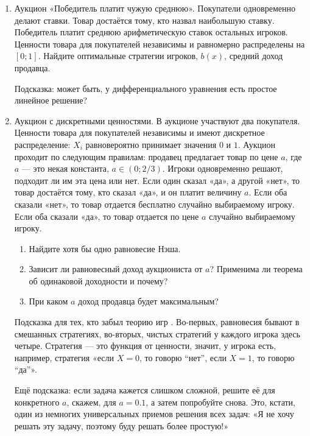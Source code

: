 \begin{enumerate}
\item Аукцион «Победитель платит чужую среднюю». Покупатели одновременно делают ставки. Товар достаётся тому, кто назвал наибольшую ставку. Победитель платит среднюю арифметическую ставок остальных игроков. Ценности товара для покупателей независимы и равномерно распределены на $ [0;1] $. Найдите оптимальные стратегии игроков, $ b(x) $, средний доход продавца.

Подсказка: может быть, у дифференциального уравнения есть простое линейное решение?


\item Аукцион с дискретными ценностями. В аукционе участвуют два покупателя. Ценности товара для покупателей независимы и имеют дискретное распределение: $ X_{i} $ равновероятно принимает значения $ 0 $ и $ 1 $. Аукцион проходит по следующим правилам: продавец предлагает товар по цене $ a $, где $ a $ — это некая константа, $ a\in (0;2/3) $. Игроки одновременно решают, подходит ли им эта цена или нет. Если один сказал «да», а другой «нет», то товар достаётся тому, кто сказал «да», и он платит величину $a$. Если оба сказали «нет», то товар отдается бесплатно случайно выбираемому игроку. Если оба сказали «да», то товар отдается по цене $ a $ случайно выбираемому игроку.

\begin{enumerate}
\item Найдите хотя бы одно равновесие Нэша.

\item Зависит ли равновесный доход аукциониста от $ a $? Применима ли теорема об одинаковой доходности и почему?

\item При каком $a$ доход продавца будет максимальным?
\end{enumerate}


Подсказка для тех, кто забыл теорию игр \Smiley. Во-первых, равновесия бывают в смешанных стратегиях, во-вторых, чистых стратегий у каждого игрока здесь четыре. Стратегия — это функция от ценности, значит, у игрока есть, например, стратегия «если $ X=0 $, то говорю “нет”, если $X=1$, то говорю “да”».


Ещё подсказка: если задача кажется слишком сложной, решите её для конкретного $ a $, скажем, для $a=0.1$, а затем попробуйте снова. Это, кстати, один из немногих универсальных приемов решения всех задач: «Я не хочу решать эту задачу, поэтому буду решать более простую!»


\end{enumerate}



